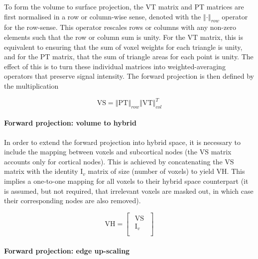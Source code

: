 \documentclass[review]{elsarticle}
\newcommand{\mat}[1]{\mathrm{#1}}
\begin{document}
To form the volume to surface projection, the VT matrix and PT matrices are first normalised in a row or column-wise sense, denoted with the $\left\Vert \cdot \right\Vert_{row}$ operator for the row-sense. This operator rescales rows or columns with any non-zero elements such that the row or column sum is unity. For the $\mat{VT}$ matrix, this is equivalent to ensuring that the sum of voxel weights for each triangle is unity, and for the $\mat{PT}$ matrix, that the sum of triangle areas for each point is unity. The effect of this is to turn these individual matrices into weighted-averaging operators that preserve signal intensity. The forward projection is then defined by the multiplication

\begin{equation}
\mathrm{VS} = \left\Vert\mathrm{PT}\right\Vert_{row} \left\Vert \mathrm{VT} \right\Vert_{col}^T
\end{equation}

\paragraph{Forward projection: volume to hybrid}

In order to extend the forward projection into hybrid space, it is necessary to include the mapping between voxels and subcortical nodes (the $\mat{VS}$ matrix accounts only for cortical nodes). This is achieved by concatenating the $\mat{VS}$ matrix with the identity $\mat{I}_v$ matrix of size (number of voxels) to yield $\mat{VH}$. This implies a one-to-one mapping for all voxels to their hybrid space counterpart (it is assumed, but not required, that irrelevant voxels are masked out, in which case their corresponding nodes are also removed). 

\begin{equation}
\mathrm{VH} =  \begin{bmatrix}
    \begin{array}{c}
  \mathrm{VS}  \\
  \hline
  \mathrm{I}_v \\
    \end{array}
  \end{bmatrix}
\end{equation}

\paragraph{Forward projection: edge up-scaling}
\end{document}
